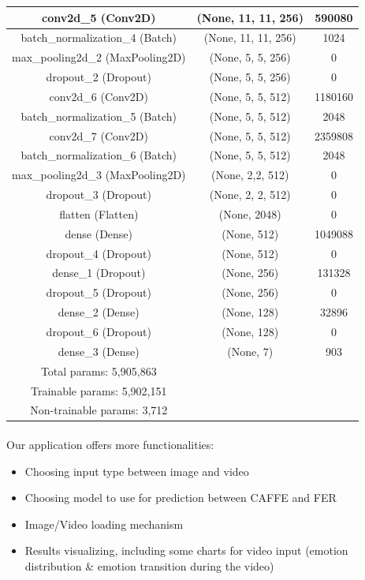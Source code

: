 \documentclass[runningheads,a4paper,11pt]{report}
\begin{document}
\begin{center}
\begin{longtable}{|| c c c ||}
    \hline
    conv2d\_5 (Conv2D) & (None, 11, 11, 256) & 590080 \\
    \hline
    batch\_normalization\_4 (Batch) & (None, 11, 11, 256) & 1024\\
    \hline
    max\_pooling2d\_2 (MaxPooling2D) & (None, 5, 5, 256) & 0\\
    \hline
    dropout\_2 (Dropout) & (None, 5, 5, 256) & 0\\
    \hline
    conv2d\_6 (Conv2D) & (None, 5, 5, 512) & 1180160\\
    \hline
    batch\_normalization\_5 (Batch) & (None, 5, 5, 512) & 2048\\
    \hline
    conv2d\_7 (Conv2D) & (None, 5, 5, 512) & 2359808\\
    \hline
    batch\_normalization\_6 (Batch) & (None, 5, 5, 512) & 2048\\
    \hline
    max\_pooling2d\_3 (MaxPooling2D) & (None, 2,2, 512) & 0\\
    \hline
    dropout\_3 (Dropout) & (None, 2, 2, 512) & 0\\
    \hline
    flatten (Flatten) & (None, 2048) & 0\\
    \hline
    dense (Dense) & (None, 512) & 1049088\\
    \hline
    dropout\_4 (Dropout) & (None, 512) & 0\\
    \hline
    dense\_1 (Dropout) & (None, 256) & 131328\\
    \hline
    dropout\_5 (Dropout) & (None, 256) & 0\\
    \hline
    dense\_2 (Dense) & (None, 128) & 32896\\
    \hline
    dropout\_6 (Dropout) & (None, 128) & 0\\
    \hline
    dense\_3 (Dense) & (None, 7) & 903 \\
    \hline
    Total params: 5,905,863 & &\\
    Trainable params: 5,902,151 & &\\
    Non-trainable params: 3,712 & & \\
    \hline
  \end{longtable}
\end{center}

\paragraph{}
Our application offers more functionalities:
\begin{itemize}
  \item Choosing input type between image and video
  \item Choosing model to use for prediction between CAFFE and FER
  \item Image/Video loading mechanism
  \item Results visualizing, including some charts for video input (emotion distribution \& emotion transition during the video)
\end{itemize}
\end{document}
